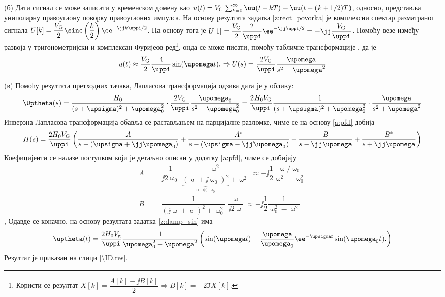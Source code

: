 (б) Дати сигнал се може записати у временском домену као 
$u(t) = V_{\rm G} \sum_{k = 0}^{\infty} \uu(t - kT) - \uu(t - (k+1/2)T)$, односно, представља униполарну правоугаону поворку 
правоугаоних импулса. 
На основу резултата задатка \ref{z:rect_povorka} је комплексни спектар разматраног сигнала
$U[k] = \dfrac{V_{\rm G}}{2} \sinc\left(\dfrac{k}{2}\right) \ee^{-\jj k \uppi / 2 } $.
На основу тога је
$U[1] = \dfrac{V_{\rm G}}{2} \dfrac{2}{\uppi} \ee^{-\jj\uppi/2} = - \jj \dfrac{V_{\rm G}}{\uppi}$.
Помоћу везе између развоја у тригонометријски и комплексан Фуријеов ред\footnote{Користи се 
резултат $X[k] = \dfrac{A[k] - \jj B[k]}{2} \Rightarrow B[k] = -2 \Im{X[k]}$.
}, онда се може писати, помоћу табличне трансформације , да је 
\begin{equation}
    u(t) \approx \dfrac{V_{\rm G}}{2}  
    \dfrac{4}{\uppi} \sin(\upomega t) .
    \Rightarrow
    U(s) = 
    \dfrac{2 V_{\rm G}}{\uppi}
    \dfrac{\upomega }{s^2 + \upomega^2}
\end{equation}

(в) Помоћу резултата претходних тачака, Лапласова трансформација одзива дата је у облику: 
\begin{equation}
    \Uptheta(s) =
    \dfrac{H_0}{(s + \upsigma)^2 + \upomega_0^2}
    \cdot
    \dfrac{2 V_{\rm G}}{\uppi}
    \dfrac{\upomega_0 }{s^2 + \upomega_0^2}
    = 
    \dfrac{2 H_0 V_{\rm G}}{\uppi}
    \dfrac{1}{(s + \upsigma)^2 + \upomega_0^2}
    \cdot
    \dfrac{\upomega }{s^2 + \upomega^2}
\end{equation}
Инверзна Лапласова трансформација обавља се растављањем на парцијалне разломке, чиме се на основу \ref{a:pfd} добија 
\begin{equation}
    H(s) = 
    \dfrac{2 H_0 V_{\rm G}}{\uppi} \left(
    \dfrac{A}{ s - (\upsigma + \jj\upomega_0 ) } + \dfrac{A^\ast}{ s - (\upsigma - \jj\upomega_0 ) } 
    + \dfrac{B}{s - \jj\upomega} + \dfrac{B^*}{s + \jj\upomega}  
    \right)
\end{equation}
Коефицијенти се налазе поступком који је детаљно описан у додатку \ref{a:pfd}, чиме се добијају
\begin{eqnarray}
    A &=& \dfrac{1}{\jj2\upomega_0} \dfrac{\upomega^2}{ \underbrace{( \upsigma + \jj\upomega_0)^2}_{\upsigma \ll \upomega_0} + \upomega^2 }
   \approx 
   - \jj
   \dfrac{1}{2} \dfrac{\upomega/\upomega_0} { \upomega^2 - \upomega_0^2 } \\
   B &=& \dfrac{1}{ (\jj\upomega + \upsigma)^2 + \upomega_0^2 } \dfrac{\upomega}{\jj2\upomega}
   \approx
   - \jj 
   \dfrac{1}{2} 
   \dfrac{1}{\upomega_0^2 - \upomega^2}
\end{eqnarray},
Одавде се коначно, на основу резултата задатка \ref{z:damp_sin} има 
\begin{equation}
    \uptheta(t) = \dfrac{2 H_0 V_{\rm g}}{\uppi}
    \dfrac{1}{\upomega_0^2 - \upomega^2}
    \left(
        \sin(\upomega t )
        -
        \dfrac{\upomega}{\upomega_0} \ee^{-\upsigma t} \sin(\upomega_0 t ).
    \right)
\end{equation}
Резултат је приказан на слици \ref{\ID.res}.

